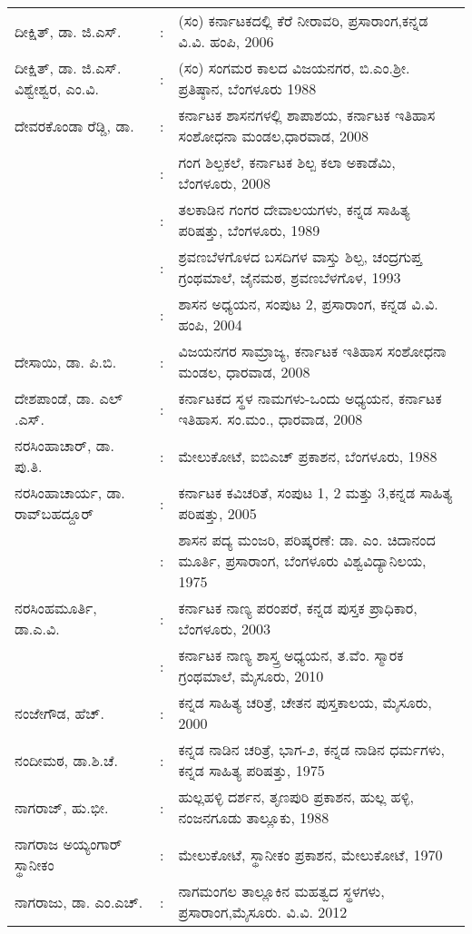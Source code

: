 \begin{longtable}[l]{@{}>{\raggedright}p{4.7cm}cp{9.2cm}<{\raggedright}@{}}
ದೀಕ್ಷಿತ್​, ಡಾ. ಜಿ.ಎಸ್​. & : &  (ಸಂ) ಕರ್ನಾಟಕದಲ್ಲಿ ಕೆರೆ ನೀರಾವರಿ, ಪ್ರಸಾರಾಂಗ,\newline ಕನ್ನಡ ವಿ.ವಿ. ಹಂಪಿ, 2006\\
ದೀಕ್ಷಿತ್​, ಡಾ. ಜಿ.ಎಸ್​. ವಿಶ್ವೇಶ್ವರ, ಎಂ.ವಿ. & : &  (ಸಂ) ಸಂಗಮರ ಕಾಲದ ವಿಜಯನಗರ, ಬಿ.ಎಂ.ಶ‍್ರೀ. ಪ್ರತಿಷ್ಠಾನ, ಬೆಂಗಳೂರು 1988\\
ದೇವರಕೊಂಡಾ ರೆಡ್ಡಿ, ಡಾ. & : & ಕರ್ನಾಟಕ ಶಾಸನಗಳಲ್ಲಿ ಶಾಪಾಶಯ, ಕರ್ನಾಟಕ ಇತಿಹಾಸ ಸಂಶೋಧನಾ ಮಂಡಲ,ಧಾರವಾಡ, 2008\\
& : & ಗಂಗ ಶಿಲ್ಪಕಲೆ, ಕರ್ನಾಟಕ ಶಿಲ್ಪ ಕಲಾ ಅಕಾಡೆಮಿ, ಬೆಂಗಳೂರು, 2008\\
& : & ತಲಕಾಡಿನ ಗಂಗರ ದೇವಾಲಯಗಳು, ಕನ್ನಡ ಸಾಹಿತ್ಯ ಪರಿಷತ್ತು, ಬೆಂಗಳೂರು, 1989\\
& : & ಶ್ರವಣಬೆಳಗೊಳದ ಬಸದಿಗಳ ವಾಸ್ತು ಶಿಲ್ಪ, ಚಂದ್ರಗುಪ್ತ ಗ್ರಂಥಮಾಲೆ, ಜೈನಮಠ, ಶ್ರವಣಬೆಳಗೊಳ, 1993\\
& : & ಶಾಸನ ಅಧ್ಯಯನ, ಸಂಪುಟ 2, ಪ್ರಸಾರಾಂಗ, ಕನ್ನಡ ವಿ.ವಿ. ಹಂಪಿ, 2004\\
ದೇಸಾಯಿ, ಡಾ. ಪಿ.ಬಿ. & : & ವಿಜಯನಗರ ಸಾಮ್ರಾಜ್ಯ, ಕರ್ನಾಟಕ ಇತಿಹಾಸ ಸಂಶೋಧನಾ ಮಂಡಲ, ಧಾರವಾಡ, 2008\\
ದೇಶಪಾಂಡೆ, ಡಾ. ಎಲ್​.ಎಸ್​. & : &  ಕರ್ನಾಟಕದ ಸ್ಥಳ ನಾಮಗಳು-ಒಂದು ಅಧ್ಯಯನ, ಕರ್ನಾಟಕ ಇತಿಹಾಸ. ಸಂ.ಮಂ., ಧಾರವಾಡ, 2008\\
ನರಸಿಂಹಾಚಾರ್​, ಡಾ. ಪು.ತಿ. & : &  ಮೇಲುಕೋಟೆ, ಐಬಿಎಚ್​ ಪ್ರಕಾಶನ, ಬೆಂಗಳೂರು, 1988\\
ನರಸಿಂಹಾಚಾರ್ಯ, ಡಾ. ರಾವ್​ಬಹದ್ದೂರ್​ & : &  ಕರ್ನಾಟಕ ಕವಿಚರಿತೆ, ಸಂಪುಟ 1, 2 ಮತ್ತು 3,\newline ಕನ್ನಡ ಸಾಹಿತ್ಯ ಪರಿಷತ್ತು, 2005\\
              & : & ಶಾಸನ ಪದ್ಯ ಮಂಜರಿ, ಪರಿಷ್ಕರಣೆ: ಡಾ. ಎಂ. ಚಿದಾನಂದ ಮೂರ್ತಿ, ಪ್ರಸಾರಾಂಗ, ಬೆಂಗಳೂರು ವಿಶ್ವವಿದ್ಯಾನಿಲಯ, 1975\\
ನರಸಿಂಹಮೂರ್ತಿ, ಡಾ.ಎ.ವಿ. & : & ಕರ್ನಾಟಕ ನಾಣ್ಯ ಪರಂಪರೆ, ಕನ್ನಡ ಪುಸ್ತಕ ಪ್ರಾಧಿಕಾರ, ಬೆಂಗಳೂರು, 2003\\
& : & ಕರ್ನಾಟಕ ನಾಣ್ಯ ಶಾಸ್ತ್ರ ಅಧ್ಯಯನ, ತ.ವೆಂ. ಸ್ಮಾರಕ ಗ್ರಂಥಮಾಲೆ, ಮೈಸೂರು, 2010\\
ನಂಜೇಗೌಡ, ಹೆಚ್​. & : & ಕನ್ನಡ ಸಾಹಿತ್ಯ ಚರಿತ್ರೆ, ಚೇತನ ಪುಸ್ತಕಾಲಯ, ಮೈಸೂರು, 2000\\
ನಂದೀಮಠ, ಡಾ.ಶಿ.ಚೆ. & : &  ಕನ್ನಡ ನಾಡಿನ ಚರಿತ್ರೆ, ಭಾಗ-೨, ಕನ್ನಡ ನಾಡಿನ ಧರ್ಮಗಳು, ಕನ್ನಡ ಸಾಹಿತ್ಯ ಪರಿಷತ್ತು, 1975\\
ನಾಗರಾಜ್​, ಹು.ಭೀ. & : & ಹುಲ್ಲಹಳ್ಳಿ ದರ್ಶನ, ತೃಣಪುರಿ ಪ್ರಕಾಶನ, ಹುಲ್ಲ ಹಳ್ಳಿ, ನಂಜನಗೂಡು ತಾಲ್ಲೂಕು, 1988\\[2pt]
ನಾಗರಾಜ ಅಯ್ಯಂಗಾರ್​ ಸ್ಥಾನೀಕಂ & : &  ಮೇಲುಕೋಟೆ, ಸ್ಥಾನೀಕಂ ಪ್ರಕಾಶನ, ಮೇಲುಕೋಟೆ, 1970\\[2pt]
ನಾಗರಾಜು, ಡಾ. ಎಂ.ಎಚ್​. & : & ನಾಗಮಂಗಲ ತಾಲ್ಲೂಕಿನ ಮಹತ್ವದ ಸ್ಥಳಗಳು, ಪ್ರಸಾರಾಂಗ,\newline ಮೈಸೂರು. ವಿ.ವಿ. 2012\\[2pt]

\end{longtable}
